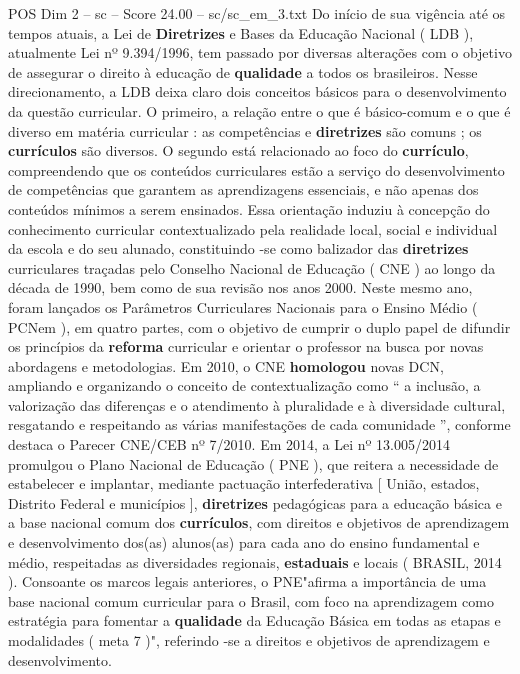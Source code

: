 \begin{textsample}{POS Dim 2 – sc – Score 24.00 – sc/sc\_em\_3.txt}
Do início de sua vigência até os tempos atuais, a Lei de \textbf{Diretrizes} e Bases da Educação Nacional ( LDB ), atualmente Lei nº 9.394/1996, tem passado por diversas alterações com o objetivo de assegurar o direito à educação de \textbf{qualidade} a todos os brasileiros.
Nesse direcionamento, a LDB deixa claro dois conceitos básicos para o desenvolvimento da questão curricular.
O primeiro, a relação entre o que é básico-comum e o que é diverso em matéria curricular : as competências e \textbf{diretrizes} são comuns ; os \textbf{currículos} são diversos.
O segundo está relacionado ao foco do \textbf{currículo}, compreendendo que os conteúdos curriculares estão a serviço do desenvolvimento de competências que garantem as aprendizagens essenciais, e não apenas dos conteúdos mínimos a serem ensinados.
Essa orientação induziu à concepção do conhecimento curricular contextualizado pela realidade local, social e individual da escola e do seu alunado, constituindo -se como balizador das \textbf{diretrizes} curriculares traçadas pelo Conselho Nacional de Educação ( CNE ) ao longo da década de 1990, bem como de sua revisão nos anos 2000.
Neste mesmo ano, foram lançados os Parâmetros Curriculares Nacionais para o Ensino Médio ( PCNem ), em quatro partes, com o objetivo de cumprir o duplo papel de difundir os princípios da \textbf{reforma} curricular e orientar o professor na busca por novas abordagens e metodologias.
Em 2010, o CNE \textbf{homologou} novas DCN, ampliando e organizando o conceito de contextualização como “ a inclusão, a valorização das diferenças e o atendimento à pluralidade e à diversidade cultural, resgatando e respeitando as várias manifestações de cada comunidade ”, conforme destaca o Parecer CNE/CEB nº 7/2010.
Em 2014, a Lei nº 13.005/2014 promulgou o Plano Nacional de Educação ( PNE ), que reitera a necessidade de estabelecer e implantar, mediante pactuação interfederativa [ União, estados, Distrito Federal e municípios ], \textbf{diretrizes} pedagógicas para a educação básica e a base nacional comum dos \textbf{currículos}, com direitos e objetivos de aprendizagem e desenvolvimento dos(as) alunos(as) para cada ano do ensino fundamental e médio, respeitadas as diversidades regionais, \textbf{estaduais} e locais ( BRASIL, 2014 ).
Consoante os marcos legais anteriores, o PNE"afirma a importância de uma base nacional comum curricular para o Brasil, com foco na aprendizagem como estratégia para fomentar a \textbf{qualidade} da Educação Básica em todas as etapas e modalidades ( meta 7 )", referindo -se a direitos e objetivos de aprendizagem e desenvolvimento.

\end{textsample}
